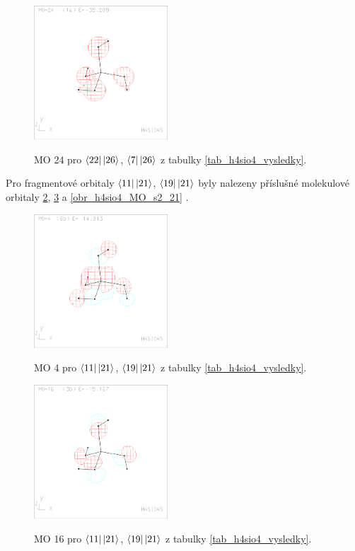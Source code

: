 \documentclass[
  digital, %
  table,   %
  lof,     %
  lot,     %
]{fithesis3}
\begin{document}
\begin{figure}[h]
\caption{MO 24 pro $\bra{22}\ket{26}$, $\bra{7}\ket{26}$ z tabulky \ref{tab_h4sio4_vysledky}.  }
  \center
  \includegraphics[width=5cm]{h4sio4_obrazky/s1_24.eps}
  \label{obr_h4sio4_MO_s1_24}
  \end{figure}
  
  Pro fragmentové orbitaly $\bra{11}\ket{21}$, $\bra{19}\ket{21}$ byly nalezeny příslušné molekulové orbitaly \ref{obr_h4sio4_MO_s2_4}, \ref{obr_h4sio4_MO_s2_16} a \ref{obr_h4sio4_MO_s2_21} .
  
  \begin{figure}[h]
\caption{MO 4 pro $\bra{11}\ket{21}$, $\bra{19}\ket{21}$ z tabulky \ref{tab_h4sio4_vysledky}.  }
  \center
  \includegraphics[width=5cm]{h4sio4_obrazky/s2_4.eps}
  \label{obr_h4sio4_MO_s2_4}
  \end{figure}

\begin{figure}[h]
\caption{MO 16 pro $\bra{11}\ket{21}$, $\bra{19}\ket{21}$ z tabulky \ref{tab_h4sio4_vysledky}.  }
  \center
  \includegraphics[width=5cm]{h4sio4_obrazky/s2_16.eps}
  \label{obr_h4sio4_MO_s2_16}
  \end{figure}
\end{document}
